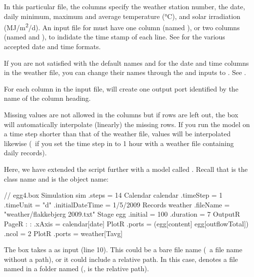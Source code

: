 In this particular file, the columns specify the weather station number, the date, daily minimum, maximum and average temperature (\si{\degreeCelsius}), and solar irradiation (\si{MJ/m^2/d}). An input file for  must have one column (named ), or two columns (named  and ), to indidate the time stamp of each line. See  for the various accepted date and time formats. 

If you are not satisfied with the default names  and  for the date and time columns in the weather file, you can change their names through the  and  inputs to . See .

For each column in the input file,  will create one output port identified by the name of the column heading.

Missing values are not allowed in the columns but if rows are left out, the  box will automatically interpolate (linearly) the missing rows. If you run the model on a time step shorter than that of the weather file, values will be interpolated likewise (\eg\ if you set the time step in  to 1 hour with a weather file containing daily records).

Here, we have extended the  script further with a  model called . Recall that  is the class name and  is the object name:

\lstset{numbers=left}
\begin{boxscript}
// egg4.box
Simulation sim {
  .steps = 14
  Calendar calendar {
    .timeStep = 1
    .timeUnit = "d"
    .initialDateTime = 1/5/2009
  }
  Records weather {
    .fileName = "weather/flakkebjerg 2009.txt"
  }
  Stage egg {
    .initial = 100 
    .duration = 7
  }
  OutputR {
    PageR {
:
:
    .xAxis = calendar[date]
      PlotR {
        .ports = (egg[content] egg[outflowTotal])   
        .ncol = 2
      }
      PlotR {
        .ports = weather[Tavg]   
      }
    }
  }
}
\end{boxscript}
\lstset{numbers=none}

The  box takes a  as input (line 10). This could be a bare file name (\ie\ a file name without a path), or it could include a relative path. In this case,  denotes a file named  in a folder named  (\ie,  is the relative path). 

